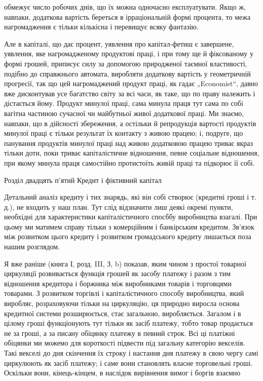 \parcont{}  %
обмежує число робочих днів, що їх можна одночасно експлуатувати.
Якщо ж, навпаки, додаткова вартість береться в ірраціональній
формі процента, то межа нагромадження є тільки кількісна
і перевищує всяку фантазію.

Але в капіталі, що дає процент, уявлення про капітал-фетиш
є завершене, уявлення, яке нагромадженому продуктові праці,
і при тому ще й фіксованому у формі грошей, приписує силу за
допомогою природженої таємної властивості, подібно до справжнього
автомата, виробляти додаткову вартість у геометричній
прогресії, так що цей нагромаджений продукт праці, як гадає
„Economist“, давно вже дисконтував усе багатство світу за всі
часи, як таке, що по праву належить і дістається йому. Продукт
минулої праці, сама минула праця тут сама по собі вагітна частиною
сучасної чи майбутньої живої додаткової праці. Ми знаємо,
навпаки, що в дійсності збереження, а остільки й репродукція
вартості продуктів минулої праці є тільки результат їх
контакту з живою працею; і, подруге, що панування продуктів
минулої праці над живою додатковою працею триває якраз тільки
доти, поки триває капіталістичне відношення, певне соціальне
відношення, при якому минула праця самостійно протистоїть
живій праці та підкорює її собі.

Розділ двадцять п’ятий
Кредит і фіктивний капітал

Детальний аналіз кредиту і тих знарядь, які він собі створює
(кредитні гроші і т. д.), не входить у наш план. Тут слід відзначити
лиш деякі окремі пункти, необхідні для характеристики
капіталістичного спосббу виробництва взагалі. При цьому ми
матимем справу тільки з комерційним і банкірським кредитом.
Зв’язок між розвитком цього кредиту і розвитком громадського
кредиту лишається поза нашим розглядом.

Я вже раніше (книга І, розд. III, З, b) показав, яким чином
з простої товарної циркуляції розвивається функція грошей як
засобу платежу і разом з тим відношення кредитора і боржника
між виробниками товарів і торговцями товарами. З розвитком
торгівлі і капіталістичного способу виробництва, який
виробляє, розраховуючи тільки на циркуляцію, ця природно виросла
основа кредитної системи розширюється, стає загальною,
виробляється. Загалом і в цілому гроші функціонують тут тільки
як засіб платежу, тобто товар продається не за гроші, а за
писану обіцянку платежу в певний строк. Всі ці платіжні обіцянки
ми можемо для короткості підвести під загальну категорію
векселів. Такі векселі до дня скінчення їх строку і настання
дня платежу в свою чергу самі циркулюють як засіб платежу;
і саме вони становлять власне торговельні гроші. Оскільки вони,
кінець-кінцем, в наслідок вирівнення вимог і боргів взаємно
\parbreak{}  %
